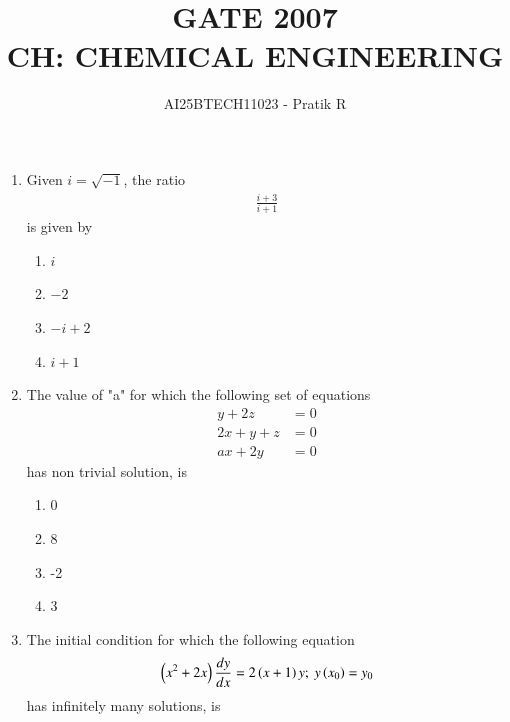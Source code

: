 \documentclass[journal,12pt,onecolumn]{IEEEtran}
\theoremstyle{remark}
\begin{document}
\title{
GATE 2007\\
CH: CHEMICAL ENGINEERING}
\author{AI25BTECH11023 - Pratik R}
\maketitle
\renewcommand{\thefigure}{\theenumi}

\begin{enumerate}
   
    \item Given $i=\sqrt{-1}$, the ratio
\begin{align*}
    \frac{i+3}{i+1}
\end{align*}
is given by

\begin{enumerate}
    \item $i$
    \item $-2$
    \item $-i+2$
    \item $i+1$
\end{enumerate}

    \item The value of "a" for which the following set of equations
\begin{align*}
        y+2z &=0 \\
        2x+y+z &=0 \\
        ax+2y &=0
\end{align*}
has non trivial solution, is

\begin{enumerate}
    \item 0
    \item 8
    \item -2
    \item 3
\end{enumerate}

    \item The initial condition for which the following equation
    \begin{align*}
        \brak{x^2+2x}\frac{dy}{dx}=2\brak{x+1}y;\text{  }y\brak{x_0}=y_0
    \end{align*}
    has infinitely many solutions, is


\end{enumerate}
\end{document}

